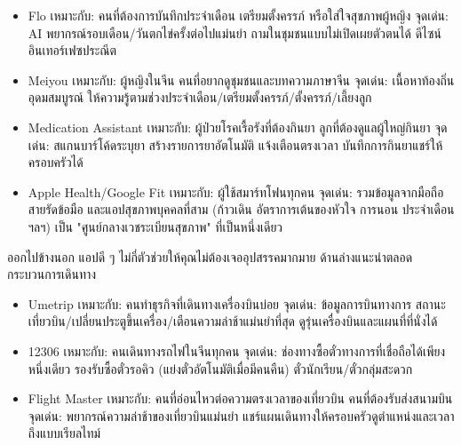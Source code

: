 
\begin{itemize}
  \item Flo เหมาะกับ: คนที่ต้องการบันทึกประจำเดือน เตรียมตั้งครรภ์ หรือใส่ใจสุขภาพผู้หญิง จุดเด่น: AI พยากรณ์รอบเดือน/วันตกไข่ครั้งต่อไปแม่นยำ ถามในชุมชนแบบไม่เปิดเผยตัวตนได้ ดีไซน์อินเทอร์เฟซประณีต
  \item Meiyou เหมาะกับ: ผู้หญิงในจีน คนที่อยากดูชุมชนและบทความภาษาจีน จุดเด่น: เนื้อหาท้องถิ่นอุดมสมบูรณ์ ให้ความรู้ตามช่วงประจำเดือน/เตรียมตั้งครรภ์/ตั้งครรภ์/เลี้ยงลูก
\end{itemize}


\begin{itemize}
  \item Medication Assistant เหมาะกับ: ผู้ป่วยโรคเรื้อรังที่ต้องกินยา ลูกที่ต้องดูแลผู้ใหญ่กินยา จุดเด่น: สแกนบาร์โค้ดระบุยา สร้างรายการยาอัตโนมัติ แจ้งเตือนตรงเวลา บันทึกการกินยาแชร์ให้ครอบครัวได้
\end{itemize}


\begin{itemize}
  \item Apple Health/Google Fit เหมาะกับ: ผู้ใช้สมาร์ทโฟนทุกคน จุดเด่น: รวมข้อมูลจากมือถือ สายรัดข้อมือ และแอปสุขภาพบุคคลที่สาม (ก้าวเดิน อัตราการเต้นของหัวใจ การนอน ประจำเดือน ฯลฯ) เป็น "ศูนย์กลางเวชระเบียนสุขภาพ" ที่เป็นหนึ่งเดียว
\end{itemize}


ออกไปข้างนอก แอปดี ๆ ไม่กี่ตัวช่วยให้คุณไม่ต้องเจออุปสรรคมากมาย ด้านล่างแนะนำตลอดกระบวนการเดินทาง


\begin{itemize}
  \item Umetrip เหมาะกับ: คนทำธุรกิจที่เดินทางเครื่องบินบ่อย จุดเด่น: ข้อมูลการบินทางการ สถานะเที่ยวบิน/เปลี่ยนประตูขึ้นเครื่อง/เตือนความล่าช้าแม่นยำที่สุด ดูรุ่นเครื่องบินและแผนที่ที่นั่งได้
  \item 12306 เหมาะกับ: คนเดินทางรถไฟในจีนทุกคน จุดเด่น: ช่องทางซื้อตั๋วทางการที่เชื่อถือได้เพียงหนึ่งเดียว รองรับซื้อตั๋วรอคิว (แย่งตั๋วอัตโนมัติเมื่อมีคนคืน) ตั๋วนักเรียน/ตั๋วกลุ่มสะดวก
  \item Flight Master เหมาะกับ: คนที่อ่อนไหวต่อความตรงเวลาของเที่ยวบิน คนที่ต้องรับส่งสนามบิน จุดเด่น: พยากรณ์ความล่าช้าของเที่ยวบินแม่นยำ แชร์แผนเดินทางให้ครอบครัวดูตำแหน่งและเวลาถึงแบบเรียลไทม์
\end{itemize}

